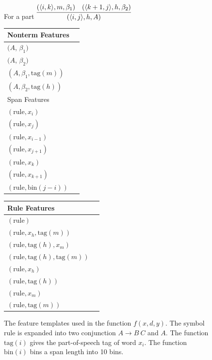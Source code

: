 \documentclass[11pt,letterpaper]{article}
\newcommand{\Span}[1]{\langle #1 \rangle}
\newcommand{\RuleSym}{\mathrm{rule}}
\newcommand{\Rule}[3]{#1 \rightarrow #2\ #3}
\newcommand{\BinFN}[1]{\mathrm{bin}({#1})}
\newcommand{\TagFN}[1]{\mathrm{tag}({#1})}
\newcommand{\WordFN}[1]{x_{#1}}
\begin{document}
\begin{figure}
  \footnotesize
  \centering
  For a part $ \infer{(\Span{i, j}, h, A)}{(\Span{i, k}, m, \beta_1) &  (\Span{k+1, j}, h, \beta_2)} $

  \vspace{0.5cm}

  \begin{multicols}{2}

  \begin{tabular}{|l|l}

  \hline
  Nonterm Features \\
  \hline

  \hline
  $(A$, $\beta_1)$ \\
  $(A$, $\beta_2)$ \\
  $(A, \beta_1, \TagFN{m})$ \\
  $(A, \beta_2, \TagFN{h})$ \\
  \hline
    \hline
  Span Features \\
  \hline

  \hline
  $(\RuleSym, \WordFN{i})$\\
  $(\RuleSym, \WordFN{j})$\\
  $(\RuleSym, \WordFN{i-1})$\\
  $(\RuleSym, \WordFN{j+1})$\\
  $(\RuleSym, \WordFN{k})$\\
  $(\RuleSym, \WordFN{k+1})$\\
  $(\RuleSym, \BinFN{j-i})$\\
  \hline

  \end{tabular}

  \begin{tabular}{|l|l}

  \hline


  Rule Features \\
  \hline

  \hline

  $(\RuleSym  )$\\
  $(\RuleSym, \WordFN{h}, \TagFN{m})$ \\
  $(\RuleSym, \TagFN{h}, \WordFN{m})$ \\
  $(\RuleSym, \TagFN{h}, \TagFN{m})$ \\

  $(\RuleSym, \WordFN{h})$ \\
  $(\RuleSym, \TagFN{h})$ \\
  $(\RuleSym, \WordFN{m})$ \\
  $(\RuleSym, \TagFN{m})$ \\

  \hline

  \end{tabular}
  \end{multicols}
  \label{fig:features}
  \caption{The feature templates used in the function $f(x, d, y)$. The symbol $\RuleSym$ is expanded into two conjunction $\Rule{A}{B}{C}$ and $A$. The function $\TagFN{i}$ gives the part-of-speech tag of word $x_i$. The function $\BinFN{i}$ bins a span length into 10 bins.
  }
\end{figure}
\end{document}
